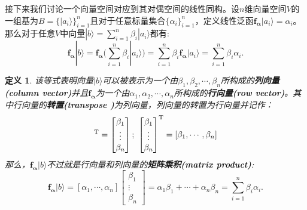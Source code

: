 \documentclass[mathserif,hyperref,UTF8,openany,b5paper]{ctexbook}
\newtheorem{defn}{定义}[section]
\begin{document}
接下来我们讨论一个向量空间对应到其对偶空间的线性同构。设$n$维向量空间$V$的一组基为$B=\{|a_i\rangle\}^n_{i=1}$且对于任意标量集合$\{\alpha_i\}^n_{i=1}$，定义线性泛函$\mathbf{f_\alpha}|a_i\rangle=\alpha_i$。那么对于任意$V$中向量$|b\rangle=\sum^n_{i=1}\beta_i|a_i\rangle$都有:
\begin{equation}
    \mathbf{f_\alpha}|b\rangle=\mathbf{f_\alpha}(\sum^n_{i=1}\beta_i|a_i\rangle)=\sum^n_{i=1}\beta_i\mathbf{f_\alpha}|a_i\rangle=\sum^n_{i=1}\beta_i\alpha_i.
\end{equation}
\begin{defn}
该等式表明向量$|b\rangle$可以被表示为一个由$\beta_1,\beta_2,\cdots,\beta_n$所构成的\textbf{列向量(column vector)}并且$\mathbf{f_\alpha}$为一个由$\alpha_1,\alpha_2,\cdots,\alpha_n$所构成的\textbf{行向量(row vector)}。其中行向量的\textbf{转置(transpose )}为列向量，列向量的转置为行向量并记作：
\begin{equation}
    [\beta_1,\cdots,\beta_n]^{\rm T}=\begin{bmatrix}
           \beta_{1} \\
           \vdots \\
           \beta_{n}
         \end{bmatrix};\ \begin{bmatrix}
           \beta_{1} \\
           \vdots \\
           \beta_{n}
         \end{bmatrix}^{\rm T} =[\beta_1,\cdots,\beta_n]
\end{equation}
那么，$\mathbf{f_\alpha}|b\rangle$不过就是行向量和列向量的\textbf{矩阵乘积(matrix product)}:
\begin{equation}
\mathbf{f_\alpha}|b\rangle=[\alpha_1,\cdots,\alpha_n]\begin{bmatrix}
           \beta_{1} \\
           \vdots \\
           \beta_{n}
         \end{bmatrix} = \alpha_1\beta_1+\cdots+\alpha_n\beta_n=\sum^n_{i=1}\beta_i\alpha_i.
\end{equation}
\end{defn}
\end{document}
